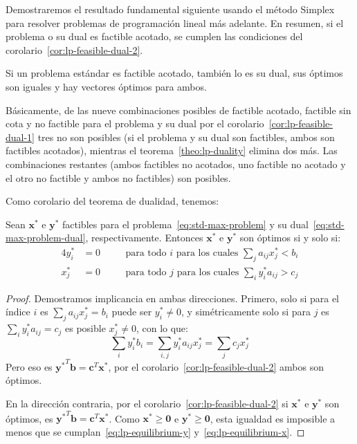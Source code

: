   Demostraremos el resultado fundamental siguiente usando el método Simplex
  para resolver problemas de programación lineal más adelante.
  En resumen,
  si el problema o su dual es factible acotado,
  se cumplen las condiciones del corolario~\ref{cor:lp-feasible-dual-2}.
  \begin{theorem}[Dualidad]
    \label{theo:lp-duality}
    Si un problema estándar es factible acotado,
    también lo es su dual,
    sus óptimos son iguales
    y hay vectores óptimos para ambos.
  \end{theorem}
  Básicamente,
  de las nueve combinaciones posibles de factible acotado,
  factible sin cota
  y no factible para el problema y su dual
  por el corolario~\ref{cor:lp-feasible-dual-1} tres no son posibles
  (si el problema y su dual son factibles,
   ambos son factibles acotados),
  mientras el teorema~\ref{theo:lp-duality} elimina dos más.
  Las combinaciones restantes
  (ambos factibles no acotados,
   uno factible no acotado y el otro no factible
   y ambos no factibles)
  son posibles.

  Como corolario del teorema de dualidad,
  tenemos:
  \begin{theorem}[Equilibrio]
    Sean \(\mathbf{x^*}\) e \(\mathbf{y^*}\) factibles
    para el problema~\eqref{eq:std-max-problem}
    y su dual~\eqref{eq:std-max-problem-dual},
    respectivamente.
    Entonces \(\mathbf{x^*}\) e \(\mathbf{y^*}\) son óptimos si y solo si:
    \begin{alignat}{4}
      y_i^* &= 0
         &\quad& \text{para todo \(i\) para los cuales
                 \(\sum_{j} a_{i j} x_j^* < b_i\)}
         \label{eq:lp-equilibrium-y} \\
      x_j^* &= 0
         && \text{para todo \(j\) para los cuales
                 \(\sum_{i}  y_i^* a_{i j} > c_j\)}
         \label{eq:lp-equilibrium-x}
    \end{alignat}
  \end{theorem}
  \begin{proof}
    Demostramos implicancia en ambas direcciones.
    Primero,
    solo si para el índice \(i\) es \(\sum_{j} a_{i j} x_j^* = b_i\)
    puede ser \(y_i^* \ne 0\),
    y simétricamente
    solo si para \(j\) es \(\sum_{i} y_i^* a_{i j} = c_j\)
    es posible \(x_j^* \ne 0\),
    con lo que:
    \begin{equation*}
      \sum_i y_i^* b_i
        = \sum_{i, j} y_i^* a_{i j} x_j^*
        = \sum_j c_j x_j^*
    \end{equation*}
    Pero eso es \(\mathbf{y^*}^T \mathbf{b} = \mathbf{c}^T \mathbf{x^*}\),
    por el corolario~\ref{cor:lp-feasible-dual-2} ambos son óptimos.

    En la dirección contraria,
    por el corolario~\ref{cor:lp-feasible-dual-2}
    si \(\mathbf{x^*}\) e \(\mathbf{y^*}\) son óptimos,
    es \(\mathbf{y^*}^T \mathbf{b} = \mathbf{c}^T \mathbf{x^*}\).
    Como \(\mathbf{x^*} \ge \mathbf{0}\)
    e \(\mathbf{y^*} \ge \mathbf{0}\),
    esta igualdad es imposible
    a menos que se cumplan~\eqref{eq:lp-equilibrium-y}
    y~\eqref{eq:lp-equilibrium-x}.
  \end{proof}


